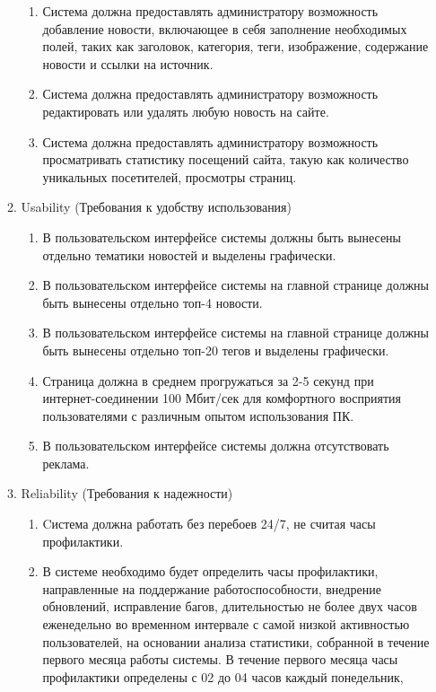 \begin{enumerate}
\begin{enumerate}[label=3.\arabic*]
\begin{enumerate}[label=3.1.\arabic*]
            \item Система должна предоставлять администратору возможность добавление новости, включающее в себя заполнение
            необходимых полей, таких как заголовок, категория, теги, изображение, содержание новости и ссылки на источник.
            \item Система должна предоставлять администратору возможность редактировать или удалять любую новость на сайте.
            \item Система должна предоставлять администратору возможность просматривать статистику посещений сайта, такую как количество уникальных посетителей, просмотры страниц.
        \end{enumerate}
        \BgThispage
        \item Usability (Требования к удобству использования)
        \begin{enumerate}[label=3.2.\arabic*]
            \item В пользовательском интерфейсе системы должны быть вынесены отдельно тематики новостей и выделены графически.
            \item В пользовательском интерфейсе системы на главной странице должны быть вынесены отдельно топ-4 новости.
            \item В пользовательском интерфейсе системы на главной странице должны быть вынесены отдельно топ-20 тегов и выделены графически.
            \item Страница должна в среднем прогружаться за 2-5 секунд при интернет-соединении 100 Мбит/сек для комфортного восприятия
            пользователями с различным опытом использования ПК.
            \item В пользовательском интерфейсе системы должна отсутствовать реклама.
        \end{enumerate}
        \newpage
        \item Reliability (Требования к надежности)
        \begin{enumerate}[label=3.3.\arabic*]
            \item Cистема должна работать без перебоев 24/7, не считая часы профилактики.
            \item В системе необходимо будет определить часы профилактики, направленные на поддержание работоспособности,
            внедрение обновлений, исправление багов, длительностью не более двух часов еженедельно во временном
            интервале с самой низкой активностью пользователей, на основании анализа статистики, собранной в течение
            первого месяца работы системы. В течение первого месяца часы профилактики определены с 02 до 04 часов каждый понедельник,

\end{enumerate}
\end{enumerate}
\end{enumerate}

